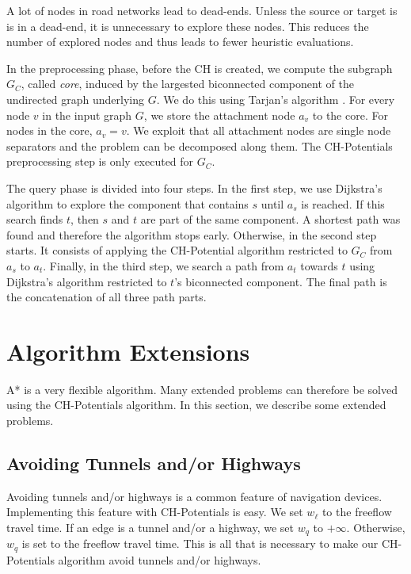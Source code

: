 \documentclass[letterpaper]{article} %
\begin{document}
\label{sec:largested-biconnected-component}

A lot of nodes in road networks lead to dead-ends.
Unless the source or target is is in a dead-end, it is unnecessary to explore these nodes.
This reduces the number of explored nodes and thus leads to fewer heuristic evaluations.

In the preprocessing phase, before the CH is created, we compute the subgraph $G_C$, called \emph{core}, induced by the largested biconnected component of the undirected graph underlying $G$.
We do this using Tarjan's algorithm \cite{t-dfslg2-72}.
For every node $v$ in the input graph $G$, we store the attachment node $a_v$ to the core.
For nodes in the core, $a_v=v$.
We exploit that all attachment nodes are single node separators and the problem can be decomposed along them.
The CH-Potentials preprocessing step is only executed for $G_C$.

The query phase is divided into four steps.
In the first step, we use Dijkstra's algorithm to explore the component that contains $s$ until $a_s$ is reached.
If this search finds $t$, then $s$ and $t$ are part of the same component.
A shortest path was found and therefore the algorithm stops early.
Otherwise, in the second step starts.
It consists of applying the CH-Potential algorithm restricted to $G_C$ from $a_s$ to $a_t$.
Finally, in the third step, we search a path from $a_t$ towards $t$ using Dijkstra's algorithm restricted to $t$'s biconnected component.
The final path is the concatenation of all three path parts.

\section{Algorithm Extensions}
\label{sec:extensions}

A* is a very flexible algorithm.
Many extended problems can therefore be solved using the CH-Potentials algorithm.
In this section, we describe some extended problems.

\subsection{Avoiding Tunnels and/or Highways}
\label{sec:no-tunnel-highway}

Avoiding tunnels and/or highways is a common feature of navigation devices.
Implementing this feature with CH-Potentials is easy.
We set $w_\ell$ to the freeflow travel time.
If an edge is a tunnel and/or a highway, we set $w_q$ to $+\infty$.
Otherwise, $w_q$ is set to the freeflow travel time.
This is all that is necessary to make our CH-Potentials algorithm avoid tunnels and/or highways.
\end{document}
